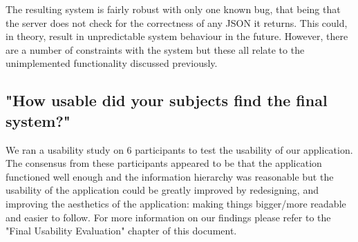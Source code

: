 \documentclass[11pt, oneside, a4paper]{report}   %
\begin{document}
The resulting system is fairly robust with only one known bug, that being that the server does not check for the correctness of any JSON it returns. This could, in theory, result in unpredictable system behaviour in the future. However, there are a number of constraints with the system but these all relate to the unimplemented functionality discussed previously.
\subsection{"How usable did your subjects find the final system?"}
We ran a usability study on 6 participants to test the usability of our application. The consensus from these participants appeared to be that the application functioned well enough and the information hierarchy was reasonable but the usability of the application could be greatly improved by redesigning, and improving the aesthetics of the application: making things bigger/more readable and easier to follow. For more information on our findings please refer to the "Final Usability Evaluation" chapter of this document.
   
\end{document}
